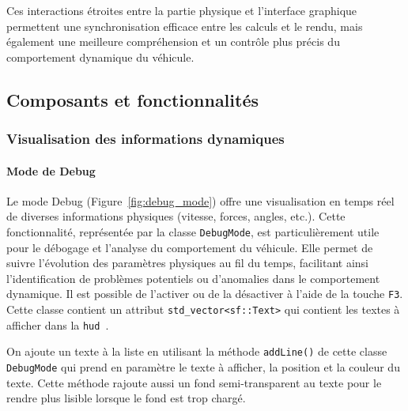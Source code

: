 Ces interactions étroites entre la partie physique et l'interface graphique permettent une synchronisation efficace entre les calculs et le rendu, mais également une meilleure compréhension et un contrôle plus précis du comportement dynamique du véhicule.


\subsection{Composants et fonctionnalités}\label{subsec:composants-et-fonctionnalites}

\subsubsection{Visualisation des informations dynamiques}\label{subsubsec:visualisation-des-informations-dynamiques}

\paragraph{Mode de Debug}
Le mode Debug (Figure~\ref{fig:debug_mode}) offre une visualisation en temps réel de diverses informations physiques (vitesse, forces, angles, etc.).
Cette fonctionnalité, représentée par la classe \texttt{DebugMode}, est particulièrement utile pour le débogage et l'analyse du comportement du véhicule.
Elle permet de suivre l'évolution des paramètres physiques au fil du temps, facilitant ainsi l'identification de problèmes potentiels ou d'anomalies dans le comportement dynamique.
Il est possible de l'activer ou de la désactiver à l'aide de la touche \texttt{F3}.
Cette classe contient un attribut \texttt{\gls{std_vector}<sf::Text>}\cite{cpp_reference_vector} qui contient les textes à afficher dans la \texttt{\gls{hud} }.

On ajoute un texte à la liste en utilisant la méthode \texttt{addLine()} de cette classe \texttt{DebugMode} qui prend en paramètre le texte à afficher, la position et la couleur du texte.
Cette méthode rajoute aussi un fond semi-transparent au texte pour le rendre plus lisible lorsque le fond est trop chargé.

